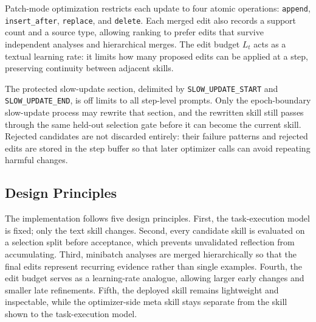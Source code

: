 Patch-mode optimization restricts each update to four atomic operations: \texttt{append}, \texttt{insert\_after}, \texttt{replace}, and \texttt{delete}. Each merged edit also records a support count and a source type, allowing ranking to prefer edits that survive independent analyses and hierarchical merges. The edit budget $L_t$ acts as a textual learning rate: it limits how many proposed edits can be applied at a step, preserving continuity between adjacent skills.

The protected slow-update section, delimited by \texttt{SLOW\_UPDATE\_START} and \texttt{SLOW\_UPDATE\_END}, is off limits to all step-level prompts. Only the epoch-boundary slow-update process may rewrite that section, and the rewritten skill still passes through the same held-out selection gate before it can become the current skill. Rejected candidates are not discarded entirely: their failure patterns and rejected edits are stored in the step buffer so that later optimizer calls can avoid repeating harmful changes.

\subsection{Design Principles}
\label{app:design_principles}

The implementation follows five design principles. First, the task-execution model is fixed; only the text skill changes. Second, every candidate skill is evaluated on a selection split before acceptance, which prevents unvalidated reflection from accumulating. Third, minibatch analyses are merged hierarchically so that the final edits represent recurring evidence rather than single examples. Fourth, the edit budget serves as a learning-rate analogue, allowing larger early changes and smaller late refinements. Fifth, the deployed skill remains lightweight and inspectable, while the optimizer-side meta skill stays separate from the skill shown to the task-execution model.
